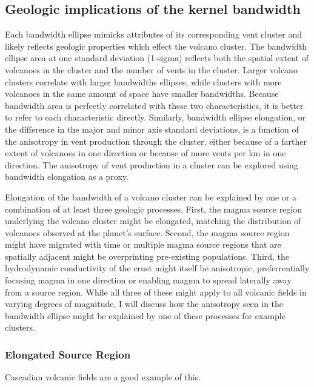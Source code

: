 \documentclass[12pt,letter]{article}
\begin{document}
\subsection{Geologic implications of the kernel bandwidth}
Each bandwidth ellipse mimicks attributes of its corresponding vent cluster and likely reflects geologic properties which effect the volcano cluster. The bandwidth ellipse area at one standard deviation (1-sigma) reflects both the spatial extent of volcanoes in the cluster and the number of vents in the cluster. Larger volcano clusters correlate with larger bandwidths ellipses, while clusters with more volcanoes in the same amount of space have smaller bandwidths. Because bandwidth area is perfectly correlated with these two characteristics, it is better to refer to each characteristic directly. Similarly, bandwidth ellipse elongation, or the difference in the major and minor axis standard deviations, is a function of the anisotropy in vent production through the cluster, either because of a farther extent of volcanoes in one direction or because of more vents per km in one direction. The anisotropy of vent production in a cluster can be explored using bandwidth elongation as a proxy.

Elongation of the bandwidth of a volcano cluster can be explained by one or a combination of at least three geologic processes. First, the magma source region underlying the volcano cluster might be elongated, matching the distribution of volcanoes observed at the planet's surface. Second, the magma source region might have migrated with time or multiple magma source regions that are spatially adjacent might be overprinting pre-existing populations. Third, the hydrodynamic conductivity of the crust might itself be anisotropic, preferrentially focusing magma in one direction or enabling magma to spread laterally away from a source region. While all three of these might apply to all volcanic fields in varying degrees of magnitude, I will discuss how the anisotropy seen in the bandwidth ellipse might be explained by one of these processes for example clusters.

\subsubsection{Elongated Source Region}
Cascadian volcanic fields are a good example of this.
\end{document}

